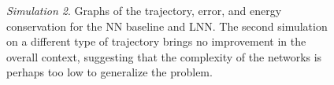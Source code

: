 \documentclass[a4paper]{article}
\begin{document}
\begin{figure}
    \centering
    \qquad
    \caption{\textit{Simulation 2}. Graphs of the trajectory, error, and energy conservation for the NN baseline and LNN. The second simulation on a different type of trajectory brings no improvement in the overall context, suggesting that the complexity of the networks is perhaps too low to generalize the problem.}
    \label{fig:elastic_300_76_87}
\end{figure}
\end{document}
